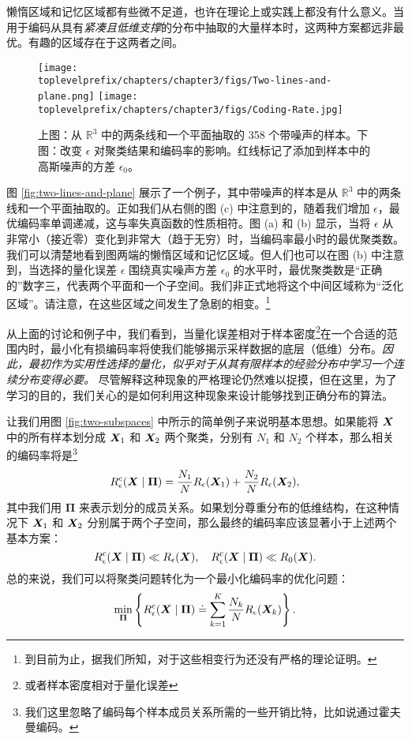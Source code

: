 \documentclass[../../book-main_zh.tex]{subfiles}
\begin{document}
懒惰区域和记忆区域都有些微不足道，也许在理论上或实践上都没有什么意义。当用于编码从具有{\em 紧凑且低维支撑}的分布中抽取的大量样本时，这两种方案都远非最优。有趣的区域存在于这两者之间。
\begin{example}
	\begin{figure}[t]
		\centering
		\texttt{[image: \\toplevelprefix/chapters/chapter3/figs/Two-lines-and-plane.png]}
		\texttt{[image: \\toplevelprefix/chapters/chapter3/figs/Coding-Rate.jpg]}
		\caption{上图：从 $\mathbb{R}^3$ 中的两条线和一个平面抽取的 358 个带噪声的样本。下图：改变 $\epsilon$ 对聚类结果和编码率的影响。红线标记了添加到样本中的高斯噪声的方差 $\epsilon_0$。}
		\label{fig:two-lines-and-plane}
		\label{fig:two-lines-and-plane-epsilon}
	\end{figure}
	图 \ref{fig:two-lines-and-plane} 展示了一个例子，其中带噪声的样本是从 $\mathbb{R}^3$ 中的两条线和一个平面抽取的。正如我们从右侧的图 (c) 中注意到的，随着我们增加 $\epsilon$，最优编码率单调递减，这与率失真函数的性质相符。图 (a) 和 (b) 显示，当将 $\epsilon$ 从非常小（接近零）变化到非常大（趋于无穷）时，当编码率最小时的最优聚类数。我们可以清楚地看到图两端的懒惰区域和记忆区域。但人们也可以在图 (b) 中注意到，当选择的量化误差 $\epsilon$ 围绕真实噪声方差 $\epsilon_0$ 的水平时，最优聚类数是“正确的”数字三，代表两个平面和一个子空间。我们非正式地将这个中间区域称为“泛化区域”。请注意，在这些区域之间发生了急剧的相变。\footnote{到目前为止，据我们所知，对于这些相变行为还没有严格的理论证明。}
\end{example}


从上面的讨论和例子中，我们看到，当量化误差相对于样本密度\footnote{或者样本密度相对于量化误差}在一个合适的范围内时，最小化有损编码率将使我们能够揭示采样数据的底层（低维）分布。{\em 因此，最初作为实用性选择的量化，似乎对于从其有限样本的经验分布中学习一个连续分布变得必要。} 尽管解释这种现象的严格理论仍然难以捉摸，但在这里，为了学习的目的，我们关心的是如何利用这种现象来设计能够找到正确分布的算法。

让我们用图 \ref{fig:two-subspaces} 中所示的简单例子来说明基本思想。如果能将 $\bm{X}$ 中的所有样本划分成 $\bm{X}_1$ 和 $\bm{X}_2$ 两个聚类，分别有 $N_1$ 和 $N_2$ 个样本，那么相关的编码率将是\footnote{我们这里忽略了编码每个样本成员关系所需的一些开销比特，比如说通过霍夫曼编码。}
\begin{equation}
	R_{\epsilon}^c(\bm{X}\mid \boldsymbol{\Pi}) = \frac{N_1}{N}R_{\epsilon}(\bm{X}_1) + \frac{N_2}{N}R_{\epsilon}(\bm{X}_2),
\end{equation}
其中我们用 $\boldsymbol{\Pi}$ 来表示划分的成员关系。如果划分尊重分布的低维结构，在这种情况下 $\bm{X}_1$ 和 $\bm{X}_2$ 分别属于两个子空间，那么最终的编码率应该显著小于上述两个基本方案：
\begin{equation}
	R_{\epsilon}^c(\bm{X} \mid \boldsymbol{\Pi}) \ll R_{\epsilon}(\bm{X}), \quad     R_{\epsilon}^c(\bm{X} \mid \boldsymbol{\Pi}) \ll R_0(\bm{X}).
\end{equation}
总的来说，我们可以将聚类问题转化为一个最小化编码率的优化问题：
\begin{equation}
	\min_{\boldsymbol{\Pi}}  \left\{ R_{\epsilon}^c(\bm{X} \mid \boldsymbol{\Pi})
	\doteq \sum_{k=1}^K \frac{N_k}{N}R_{\epsilon}(\bm{X}_k)\right\}.
\end{equation}
\end{document}
